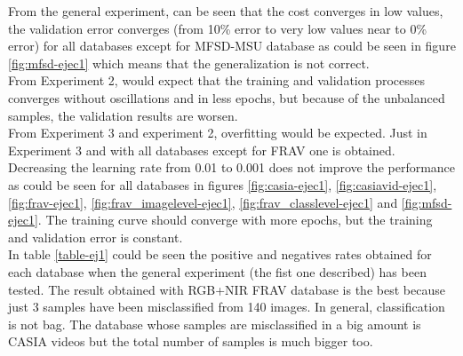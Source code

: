 

From the general experiment, can be seen that the cost converges in low values, the validation error converges (from 10\% error to very low values near to 0\% error) for all databases except for MFSD-MSU database as could be seen in figure \ref{fig:mfsd-ejec1} which means that the generalization is not correct. \\

From Experiment 2, would expect that the training and validation processes converges without oscillations and in less epochs, but because of the unbalanced samples, the validation results are worsen.\\

From Experiment 3 and experiment 2, overfitting would be expected. Just in Experiment 3 and with all databases except for FRAV one is obtained.\\

Decreasing the learning rate from 0.01 to 0.001 does not improve the performance as could be seen for all databases in figures \ref{fig:casia-ejec1}, \ref{fig:casiavid-ejec1}, \ref{fig:frav-ejec1}, \ref{fig:frav_imagelevel-ejec1}, \ref{fig:frav_classlevel-ejec1} and \ref{fig:mfsd-ejec1}. The  training curve should converge with more epochs, but the training and validation error is constant.\\

In table \ref{table-ej1} could be seen the positive and negatives rates obtained for each database when the general experiment (the fist one described) has been tested. The result obtained with RGB+NIR FRAV database is the best because just 3 samples have been misclassified from 140 images. In general, classification is not bag. The database whose samples are misclassified in a big amount is CASIA videos but the total number of samples is much bigger too.\\

